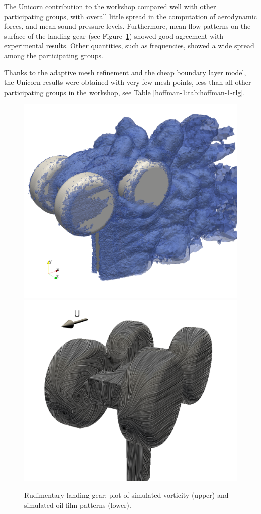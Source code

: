 The Unicorn contribution to the workshop compared well with other
participating groups, with overall little spread in the computation
of aerodynamic forces, and mean sound pressure levels. Furthermore, mean flow
patterns on the surface of the landing gear (see Figure~\ref{hoffman-1:rlg})
showed good agreement with experimental results. Other quantities, such
as frequencies, showed a wide spread among the participating groups.

Thanks to the adaptive mesh refinement and the cheap boundary layer
model, the Unicorn results were obtained with very few mesh points,
less than all other participating groups in the workshop, see Table
\ref{hoffman-1:tab:hoffman-1-rlg}.

\begin{figure}
  \centering
  \includegraphics[width=\twofigs]{chapters/hoffman-1/png/rlg_vorticity}
  \includegraphics[width=\twofigs]{chapters/hoffman-1/png/oilfilm_back_sim}
  \caption{Rudimentary landing gear: plot of simulated vorticity (upper)
    and simulated oil film patterns (lower).}
  \label{hoffman-1:rlg}
\end{figure}

